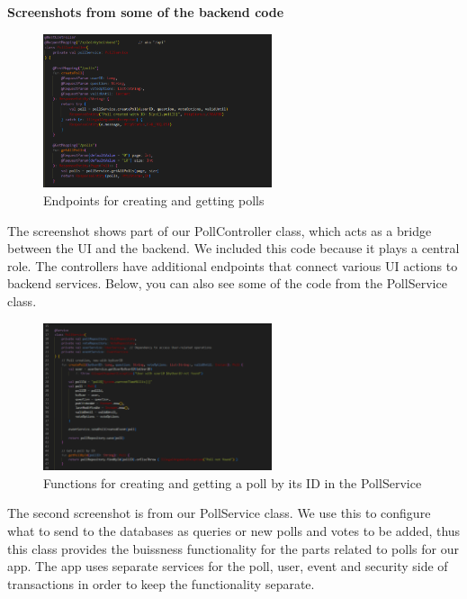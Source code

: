 \noindent \textbf{Screenshots from some of the backend code}

\begin{figure}[H]
	\centering
	\includegraphics[width=0.6\textwidth]{../images/pollController.png}
	\caption{Endpoints for creating and getting polls}
	\label{fig:pollController}
\end{figure}

\noindent The screenshot shows part of our PollController class, which acts as a bridge between the UI and the backend. We included this code because it plays a central role. The controllers have additional endpoints that connect various UI actions to backend services. Below, you can also see some of the code from the PollService class.

\begin{figure}[H]
	\centering
	\includegraphics[width=0.6\textwidth]{../images/pollService.png}
	\caption{Functions for creating and getting a poll by its ID in the PollService}
	\label{fig:pollService}
\end{figure}

\noindent The second screenshot is from our PollService class. We use this to configure what to send to the databases as queries or new polls and votes to be added, thus this class provides the buissness functionality for the parts related to polls for our app. The app uses separate services for the poll, user, event and security side of transactions in order to keep the functionality separate.

